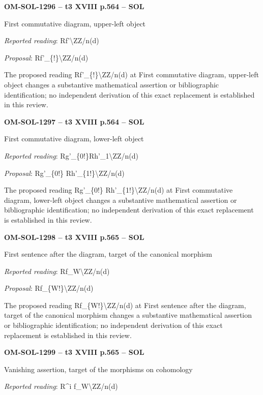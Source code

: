 \par\noindent\textbf{OM-SOL-1296 -- t3 XVIII p.564 -- SOL}\par
First commutative diagram, upper-left object\par
\emph{Reported reading}: Rf'\textbackslash{}ZZ/n(d)\par
\emph{Proposal}: Rf'\_\{!\}\textbackslash{}ZZ/n(d)\par
The proposed reading Rf'\_\{!\}\textbackslash{}ZZ/n(d) at First commutative diagram, upper-left object changes a substantive mathematical assertion or bibliographic identification; no independent derivation of this exact replacement is established in this review.\par
\par\noindent\textbf{OM-SOL-1297 -- t3 XVIII p.564 -- SOL}\par
First commutative diagram, lower-left object\par
\emph{Reported reading}: Rg'\_\{0!\}Rh'\_1\textbackslash{}ZZ/n(d)\par
\emph{Proposal}: Rg'\_\{0!\} Rh'\_\{1!\}\textbackslash{}ZZ/n(d)\par
The proposed reading Rg'\_\{0!\} Rh'\_\{1!\}\textbackslash{}ZZ/n(d) at First commutative diagram, lower-left object changes a substantive mathematical assertion or bibliographic identification; no independent derivation of this exact replacement is established in this review.\par
\par\noindent\textbf{OM-SOL-1298 -- t3 XVIII p.565 -- SOL}\par
First sentence after the diagram, target of the canonical morphism\par
\emph{Reported reading}: Rf\_W\textbackslash{}ZZ/n(d)\par
\emph{Proposal}: Rf\_\{W!\}\textbackslash{}ZZ/n(d)\par
The proposed reading Rf\_\{W!\}\textbackslash{}ZZ/n(d) at First sentence after the diagram, target of the canonical morphism changes a substantive mathematical assertion or bibliographic identification; no independent derivation of this exact replacement is established in this review.\par
\par\noindent\textbf{OM-SOL-1299 -- t3 XVIII p.565 -- SOL}\par
Vanishing assertion, target of the morphisms on cohomology\par
\emph{Reported reading}: R\textasciicircum{}i f\_W\textbackslash{}ZZ/n(d)\par
